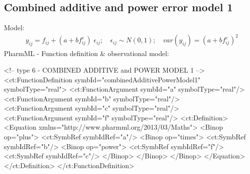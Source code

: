 \documentclass[a4paper,10pt]{article}
\begin{document}
\subsection{Combined additive and power error model 1}
\label{model6}
Model:
\begin{eqnarray}
&& y_{ij} =  f_{ij} + (a + b f_{ij}^c) \; \epsilon_{ij}; \quad \epsilon_{ij} \sim N(0,1); \quad \mathit{var}(y_{ij}) = (a + bf_{ij}^c)^2 \nonumber
\end{eqnarray}
PharmML - Function definition \& observational model:
\begin{xmlcode}
<!-- type 6 - COMBINED ADDITIVE and POWER MODEL 1 -->
<ct:FunctionDefinition symbId="combinedAdditivePowerModel1" symbolType="real">
    <ct:FunctionArgument symbId="a" symbolType="real"/>
    <ct:FunctionArgument symbId="b" symbolType="real"/>
    <ct:FunctionArgument symbId="c" symbolType="real"/>
    <ct:FunctionArgument symbId="f" symbolType="real"/>
    <ct:Definition>
        <Equation xmlns="http://www.pharmml.org/2013/03/Maths">
            <Binop op="plus">
                <ct:SymbRef symbIdRef="a"/>
                <Binop op="times">
                    <ct:SymbRef symbIdRef="b"/>
                    <Binop op="power">
                        <ct:SymbRef symbIdRef="f"/>
                        <ct:SymbRef symbIdRef="c"/>
                    </Binop>
                </Binop>
            </Binop>
        </Equation>
    </ct:Definition>
</ct:FunctionDefinition>


\end{xmlcode}
\end{document}
